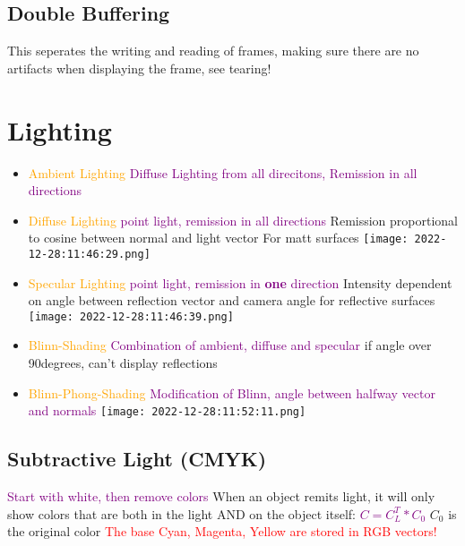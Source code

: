 \documentclass[main.tex,fontsize=12pt,paper=a4,paper=landscape,DIV=calc,]{scrartcl}
\begin{document}
\begin{multicols*}{4}
\subsection{Double Buffering}
This seperates the writing and reading of frames, making sure there are no artifacts when displaying the frame, see tearing!

\section{Lighting}
\begin{itemize}
\item \textcolor{orange}{Ambient Lighting}\newline
\textcolor{purple}{Diffuse Lighting from all direcitons, Remission in all directions}\newline
\item \textcolor{orange}{Diffuse Lighting}\newline
\textcolor{purple}{point light, remission in all directions}\newline
Remission proportional to cosine between normal and light vector\newline
\textcolor{OliveGreen}{For matt surfaces}\newline
\texttt{[image: 2022-12-28:11:46:29.png]}
\item \textcolor{orange}{Specular Lighting}\newline
\textcolor{purple}{point light, remission in \textbf{one} direction}\newline
Intensity dependent on angle between reflection vector and camera angle\newline
\textcolor{OliveGreen}{for reflective surfaces}\newline
\texttt{[image: 2022-12-28:11:46:39.png]}
\item \textcolor{orange}{Blinn-Shading}\newline
  \textcolor{purple}{Combination of ambient, diffuse and specular}\newline
  if angle over 90degrees, can't display reflections
\item \textcolor{orange}{Blinn-Phong-Shading}\newline
  \textcolor{purple}{Modification of Blinn, angle between halfway vector and normals}\newline
  \texttt{[image: 2022-12-28:11:52:11.png]}
\end{itemize} 

\subsection{Subtractive Light (CMYK)}
\textcolor{purple}{Start with white, then remove colors}\newline
When an object remits light, it will only show colors that are both in the light AND on the object itself:\newline
\textcolor{purple}{\(C = C_L^T * C_0\)}\newline
\(C_0\) is the original color\newline
\textcolor{red}{The base Cyan, Magenta, Yellow are stored in RGB vectors!}


\end{multicols*}
\end{document}
